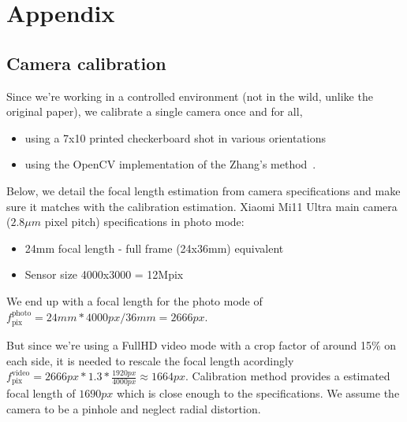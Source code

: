 \section{Appendix}
\subsection{Camera calibration}
\label{app:cam_calib}
Since we're working in a controlled environment (not in the wild, unlike the original paper), we calibrate a single camera once and for all,
\begin{itemize}
    \item using a 7x10 printed checkerboard shot in various orientations
    \item  using the OpenCV implementation of the Zhang's method~\cite{Zhang00calib}.
\end{itemize}

Below, we detail the focal length estimation from camera specifications
and make sure it matches with the calibration estimation.
Xiaomi Mi11 Ultra main camera ($2.8\mu m$ pixel pitch) specifications in photo mode:
\begin{itemize}
    \item 24mm focal length - full frame (24x36mm) equivalent
    \item Sensor size 4000x3000 = 12Mpix
\end{itemize}
We end up with a focal length for the photo mode of $f_{\text{pix}}^{\text{photo}}  = 24mm * 4000px / 36mm = 2666px$.

But since we're using a FullHD video mode with a crop factor of around 15\% on each side,
it is needed to rescale the focal length acordingly $f_{\text{pix}}^{\text{video}} = 2666px * 1.3 * \frac{1920px}{4000px} \approx 1664px$.
Calibration method provides a estimated focal length of $1690px$ which is close enough to the specifications.
We assume the camera to be a pinhole and neglect radial distortion.

